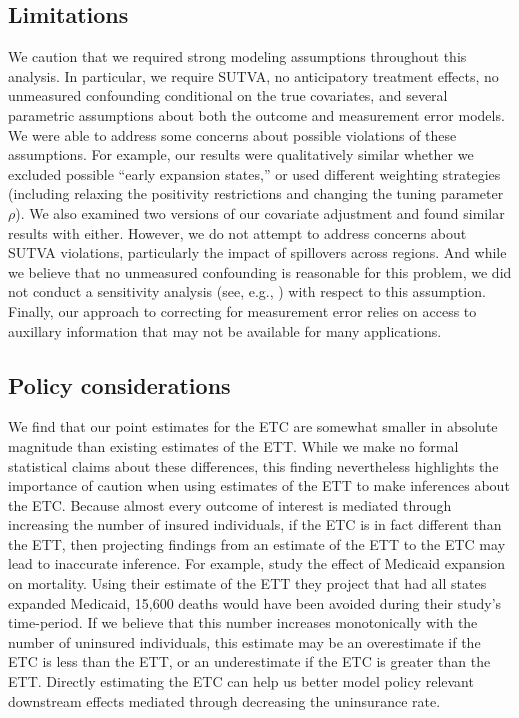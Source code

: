 \documentclass[aoas]{imsart}
\theoremstyle{plain}
\theoremstyle{remark}
\begin{document}
\subsection{Limitations}

We caution that we required strong modeling assumptions throughout this analysis. In particular, we require SUTVA, no anticipatory treatment effects, no unmeasured confounding conditional on the true covariates, and several parametric assumptions about both the outcome and measurement error models. We were able to address some concerns about possible violations of these assumptions. For example, our results were qualitatively similar whether we excluded possible ``early expansion states,'' or used different weighting strategies (including relaxing the positivity restrictions and changing the tuning parameter $\rho$). We also examined two versions of our covariate adjustment and found similar results with either. However, we do not attempt to address concerns about SUTVA violations, particularly the impact of spillovers across regions. And while we believe that no unmeasured confounding is reasonable for this problem, we did not conduct a sensitivity analysis (see, e.g., \cite{bonvini2021sensitivity}) with respect to this assumption. Finally, our approach to correcting for measurement error relies on access to auxillary information that may not be available for many applications.

\subsection{Policy considerations}

We find that our point estimates for the ETC are somewhat smaller in absolute magnitude than existing estimates of the ETT. While we make no formal statistical claims about these differences, this finding nevertheless highlights the importance of caution when using estimates of the ETT to make inferences about the ETC. Because almost every outcome of interest is mediated through increasing the number of insured individuals, if the ETC is in fact different than the ETT, then projecting findings from an estimate of the ETT to the ETC may lead to inaccurate inference. For example, \cite{miller2019medicaid} study the effect of Medicaid expansion on mortality. Using their estimate of the ETT they project that had all states expanded Medicaid, 15,600 deaths would have been avoided during their study's time-period. If we believe that this number increases monotonically with the number of uninsured individuals, this estimate may be an overestimate if the ETC is less than the ETT, or an underestimate if the ETC is greater than the ETT. Directly estimating the ETC can help us better model policy relevant downstream effects mediated through decreasing the uninsurance rate. 
\end{document}
